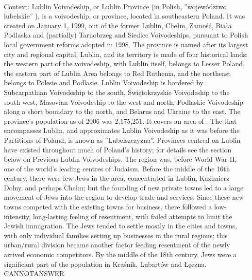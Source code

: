 \documentclass[11pt,a4paper, onecolumn]{article}
\begin{document}
\\ Context: Lublin Voivodeship, or Lublin Province (in Polish, ''województwo lubelskie'' ), is a voivodeship, or province, located in southeastern Poland. It was created on January 1, 1999, out of the former Lublin, Chełm, Zamość, Biała Podlaska and (partially) Tarnobrzeg and Siedlce Voivodeships, pursuant to Polish local government reforms adopted in 1998. The province is named after its largest city and regional capital, Lublin, and its territory is made of four historical lands: the western part of the voivodeship, with Lublin itself, belongs to Lesser Poland, the eastern part of Lublin Area belongs to Red Ruthenia, and the northeast belongs to Polesie and Podlasie. Lublin Voivodeship is bordered by Subcarpathian Voivodeship to the south, Świętokrzyskie Voivodeship to the south-west, Masovian Voivodeship to the west and north, Podlaskie Voivodeship along a short boundary to the north, and Belarus and Ukraine to the east. The province's population as of 2006 was 2,175,251. It covers an area of . The that encompasses Lublin, and approximates Lublin Voivodeship as it was before the Partitions of Poland, is known as ''Lubelszczyzna''. Provinces centred on Lublin have existed throughout much of Poland's history; for details see the section below on Previous Lublin Voivodeships. The region was, before World War II, one of the world's leading centres of Judaism. Before the middle of the 16th century, there were few Jews in the area, concentrated in Lublin, Kazimierz Dolny, and perhaps Chełm; but the founding of new private towns led to a large movement of Jews into the region to develop trade and services. Since these new towns competed with the existing towns for business, there followed a low-intensity, long-lasting feeling of resentment, with failed attempts to limit the Jewish immigration. The Jews tended to settle mostly in the cities and towns, with only individual families setting up businesses in the rural regions; this urban/rural division became another factor feeding resentment of the newly arrived economic competitors. By the middle of the 18th century, Jews were a significant part of the population in Kraśnik, Lubartów and Łęczna. CANNOTANSWER
\end{document}
